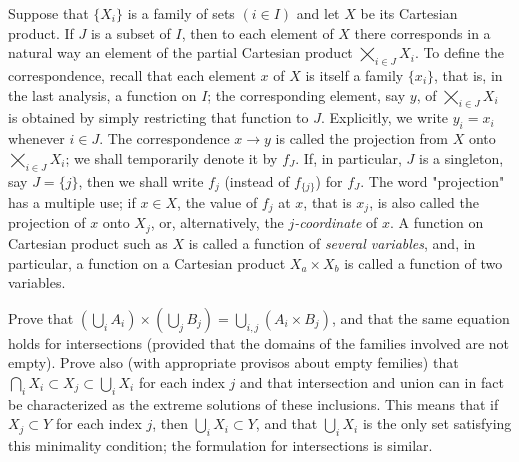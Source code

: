 Suppose that $\{ X_{i} \}$ is a family of sets $(i \in I)$ and let $X$ be its Cartesian product. If $J$ is a subset of $I$, then to each element of $X$ there corresponds in a natural way an element of the partial Cartesian product $\bigtimes_{i \in J}X_{i}$. To define the correspondence, recall that each element $x$ of $X$ is itself a family $\{ x_{i} \}$, that is, in the last analysis, a function on $I$; the corresponding element, say $y$, of $\bigtimes_{i \in J}X_{i}$ is obtained by simply restricting that function to $J$. Explicitly, we write $y_{i} = x_{i}$ whenever $i \in J$. The correspondence $x \rightarrow y$ is called the projection from $X$ onto $\bigtimes_{i \in J}X_{i}$; we shall temporarily denote it by $f_{J}$. If, in particular, $J$ is a singleton, say $J = \{ j \}$, then we shall write $f_{j}$ (instead of $f_{ \{j \} }$) for $f_{J}$. The word "projection" has a multiple use; if $x \in X$, the value of $f_{j}$ at $x$, that is $x_{j}$, is also called the projection of $x$ onto $X_{j}$, or, alternatively, the \textit{$j$-coordinate} of $x$. A function on Cartesian product such as $X$ is called a function of \textit{several variables}, and, in particular, a function on a Cartesian product $X_{a} \times X_{b}$ is called a function of two variables. 

\begin{named}[Exercise. ] Prove that $(\bigcup_{i}A_{i}) \times (\bigcup_{j}B_{j}) = \bigcup_{i,j}(A_{i} \times B_{j})$, and that the same equation holds for intersections (provided that the domains of the families involved are not empty). Prove also (with appropriate provisos about empty femilies) that $\bigcap_{i}X_{i} \subset X_{j} \subset \bigcup_{i}X_{i}$ for each index $j$ and that intersection and union can in fact be characterized as the extreme solutions of these inclusions. This means that if $X_{j} \subset Y$ for each index $j$, then $\bigcup_{i}X_{i} \subset Y$, and that $\bigcup_{i}X_{i}$ is the only set satisfying this minimality condition; the formulation for intersections is similar.
\end{named}